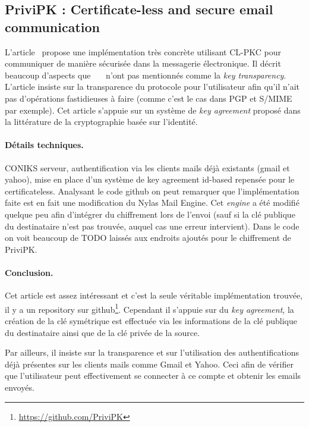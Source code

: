 \subsection{PriviPK : Certificate-less and secure email communication}
L'article~\cite{journals/compsec/AlSabahTLSD17} propose une implémentation très concrète utilisant CL-PKC pour communiquer de manière sécurisée dans la messagerie électronique. Il décrit beaucoup d'aspects que~\cite{conf/itcs2/ErYTG12}~\cite{endToEndSecureEmailArticle}~\cite{journals/ijnsec/BalakrishnanR16} n'ont pas mentionnés comme la \textit{key transparency}. L'article insiste sur la transparence du protocole pour l'utilisateur afin qu'il n'ait pas d'opérations fastidieuses à faire (comme c'est le cas dans PGP et S/MIME par exemple). Cet article s'appuie sur un système de \textit{key agreement} proposé dans la littérature de la cryptographie basée sur l'identité.

\paragraph*{Détails techniques.} CONIKS serveur, authentification via les clients mails déjà existants (gmail et yahoo), mise en place d'un système de key agreement id-based repensée pour le certificateless. Analysant le code github on peut remarquer que l'implémentation faite est en fait une modification du Nylas Mail Engine. Cet \textit{engine} a été modifié quelque peu afin d'intégrer du chiffrement lors de l'envoi (sauf si la clé publique du destinataire n'est pas trouvée, auquel cas une erreur intervient). Dans le code on voit beaucoup de TODO laissés aux endroits ajoutés pour le chiffrement de PriviPK. 

\paragraph*{Conclusion.} Cet article est assez intéressant et c'est la seule véritable implémentation trouvée, il y a un repository sur github\footnote{\url{https://github.com/PriviPK}}. Cependant il s'appuie sur du \textit{key agreement}, la création de la clé symétrique est effectuée via les informations de la clé publique du destinataire ainsi que de la clé privée de la source.

Par ailleurs, il insiste sur la transparence et sur l'utilisation des authentifications déjà présentes sur les clients mails comme Gmail et Yahoo. Ceci afin de vérifier que l'utilisateur peut effectivement se connecter à ce compte et obtenir les emails envoyés.

